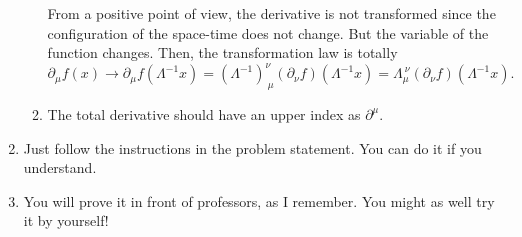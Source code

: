 \documentclass[a4paper,pdftex]{article}
\begin{document}
\begin{enumerate}
\begin{enumerate}
      From a positive point of view, the derivative is not transformed since the configuration of the space-time does not change. But the variable of the function changes. Then, the transformation law is totally
      \begin{equation}
         \partial_{\mu}f(x)
         \rightarrow
         \partial_{\mu}f(\Lambda^{-1}x)
         =
         (\Lambda^{-1})^{\nu}_{\ \mu}(\partial_{\nu}f)(\Lambda^{-1}x)
         =
         \Lambda_{\mu}^{\ \nu}(\partial_{\nu}f)(\Lambda^{-1}x)
         .
      \end{equation}

      \item 
      The total derivative should have an upper index as $\partial^{\mu}$.
   \end{enumerate}

   \item 
   Just follow the instructions in the problem statement. You can do it if you understand.

   \item 
   You will prove it in front of professors, as I remember. You might as well try it by yourself!
\end{enumerate}
\end{document}
